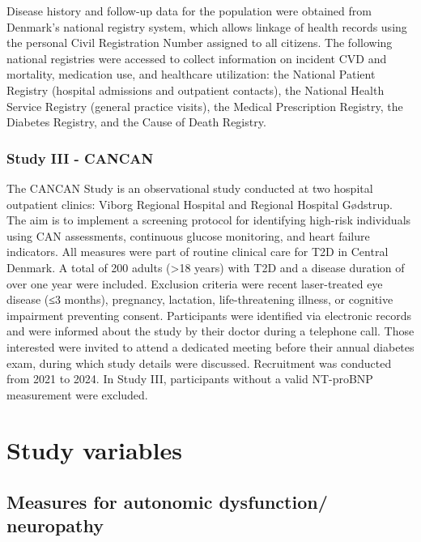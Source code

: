 \documentclass[
  a4paper,
  headsepline=true,
  open=any]{scrbook}
\begin{document}
Disease history and follow-up data for the population were obtained from
Denmark's national registry system, which allows linkage of health
records using the personal Civil Registration Number assigned to all
citizens. The following national registries were accessed to collect
information on incident CVD and mortality, medication use, and
healthcare utilization: the National Patient Registry (hospital
admissions and outpatient contacts), the National Health Service
Registry (general practice visits), the Medical Prescription Registry,
the Diabetes Registry, and the Cause of Death Registry.

\hypertarget{study-iii---cancan}{%
\subsubsection{Study III - CANCAN}\label{study-iii---cancan}}

The CANCAN Study is an observational study conducted at two hospital
outpatient clinics: Viborg Regional Hospital and Regional Hospital
Gødstrup. The aim is to implement a screening protocol for identifying
high-risk individuals using CAN assessments, continuous glucose
monitoring, and heart failure indicators. All measures were part of
routine clinical care for T2D in Central Denmark. A total of 200 adults
(\textgreater18 years) with T2D and a disease duration of over one year
were included. Exclusion criteria were recent laser-treated eye disease
(≤3 months), pregnancy, lactation, life-threatening illness, or
cognitive impairment preventing consent. Participants were identified
via electronic records and were informed about the study by their doctor
during a telephone call. Those interested were invited to attend a
dedicated meeting before their annual diabetes exam, during which study
details were discussed. Recruitment was conducted from 2021 to 2024. In
Study III, participants without a valid NT-proBNP measurement were
excluded.

\hypertarget{study-variables}{%
\section{Study variables}\label{study-variables}}

\hypertarget{measures-for-autonomic-dysfunction-neuropathy}{%
\subsection{Measures for autonomic dysfunction/
neuropathy}\label{measures-for-autonomic-dysfunction-neuropathy}}
\end{document}
